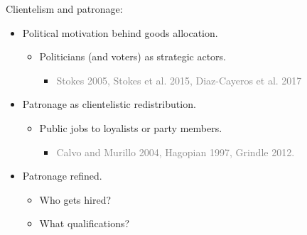 \documentclass[ignorenonframetext,]{beamer}
\providecommand{\tightlist}{%
  \setlength{\itemsep}{0pt}\setlength{\parskip}{0pt}}
\begin{document}
\begin{frame}{Clientelism and patronage:}

\begin{itemize}[<+->]
\tightlist
\item
  Political motivation behind goods allocation.

  \begin{itemize}[<+->]
  \tightlist
  \item
    Politicians (and voters) as strategic actors.

    \begin{itemize}[<+->]
    \tightlist
    \item
      \textcolor{gray}{Stokes 2005, Stokes et al. 2015, Diaz-Cayeros et al. 2017}
    \end{itemize}
  \end{itemize}
\item
  Patronage as clientelistic redistribution.

  \begin{itemize}[<+->]
  \tightlist
  \item
    Public jobs to loyalists or party members.

    \begin{itemize}[<+->]
    \tightlist
    \item
      \textcolor{gray}{Calvo and Murillo 2004, Hagopian 1997, Grindle 2012.}
    \end{itemize}
  \end{itemize}
\item
  Patronage refined.

  \begin{itemize}[<+->]
  \tightlist
  \item
    Who gets hired?
  \item
    What qualifications?
  \end{itemize}
\end{itemize}

\end{frame}
\end{document}
